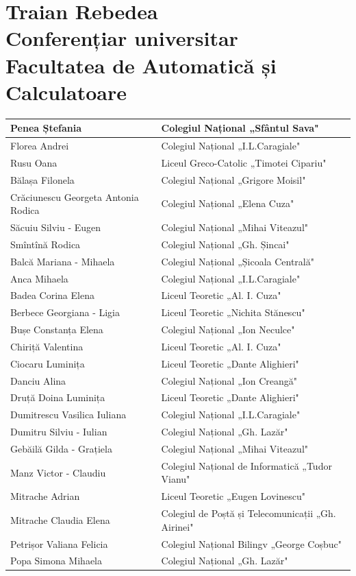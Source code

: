 \documentclass[10pt]{article}
\begin{document}
\section*{Traian Rebedea \\
 Conferențiar universitar \\
 Facultatea de Automatică și Calculatoare}
\begin{center}
\begin{tabular}{|l|l|}
\hline
Penea Ștefania & Colegiul Național „Sfântul Sava" \\
\hline
Florea Andrei & Colegiul Național „I.L.Caragiale" \\
\hline
Rusu Oana & Liceul Greco-Catolic „Timotei Cipariu" \\
\hline
Bălașa Filonela & Colegiul Național „Grigore Moisil" \\
\hline
Crăciunescu Georgeta Antonia Rodica & Colegiul Național „Elena Cuza" \\
\hline
Săcuiu Silviu - Eugen & Colegiul Național „Mihai Viteazul" \\
\hline
Smîntînă Rodica & Colegiul Național „Gh. Șincai" \\
\hline
Balcă Mariana - Mihaela & Colegiul Național „Șicoala Centrală" \\
\hline
Anca Mihaela & Colegiul Național „I.L.Caragiale" \\
\hline
Badea Corina Elena & Liceul Teoretic „Al. I. Cuza" \\
\hline
Berbece Georgiana - Ligia & Liceul Teoretic „Nichita Stănescu" \\
\hline
Bușe Constanța Elena & Colegiul Național „Ion Neculce" \\
\hline
Chiriță Valentina & Liceul Teoretic „Al. I. Cuza" \\
\hline
Ciocaru Luminița & Liceul Teoretic „Dante Alighieri" \\
\hline
Danciu Alina & Colegiul Național „Ion Creangă" \\
\hline
Druță Doina Luminița & Liceul Teoretic „Dante Alighieri" \\
\hline
Dumitrescu Vasilica Iuliana & Colegiul Național „I.L.Caragiale" \\
\hline
Dumitru Silviu - Iulian & Colegiul Național „Gh. Lazăr" \\
\hline
Gebăilă Gilda - Grațiela & Colegiul Național „Mihai Viteazul" \\
\hline
Manz Victor - Claudiu & Colegiul Național de Informatică „Tudor Vianu" \\
\hline
Mitrache Adrian & Liceul Teoretic „Eugen Lovinescu" \\
\hline
Mitrache Claudia Elena & Colegiul de Poștă și Telecomunicații „Gh. Airinei" \\
\hline
Petrișor Valiana Felicia & Colegiul Național Bilingv „George Coșbuc" \\
\hline
Popa Simona Mihaela & Colegiul Național „Gh. Lazăr" \\
\hline
\end{tabular}
\end{center}
\end{document}
